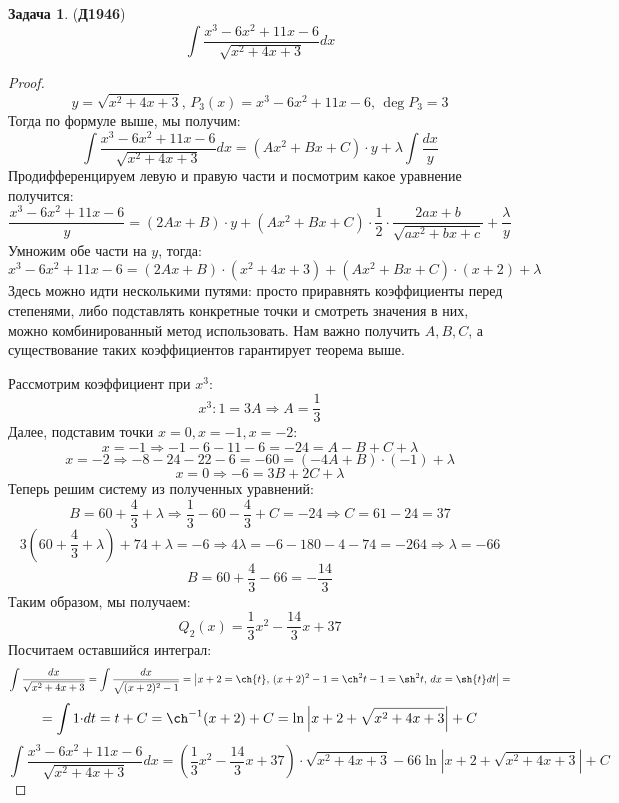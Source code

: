 \documentclass[12pt]{article}
\theoremstyle{definition}
\newtheorem{problem}{Задача}
\DeclareMathOperator{\dint}{\displaystyle\int}
\begin{document}
\begin{problem}(\textbf{Д1946})
	$$
		\dint \dfrac{x^3 - 6x^2 +11 x - 6}{\sqrt{x^2 + 4x + 3}}dx
	$$
\end{problem}
\begin{proof}
	$$
		y = \sqrt{x^2 + 4x + 3}, \, P_3(x) = x^3 - 6x^2 + 11x - 6, \, \deg{P_3} = 3
	$$
	Тогда по формуле выше, мы получим:
	$$
		\dint \dfrac{x^3 - 6x^2 +11 x - 6}{\sqrt{x^2 + 4x + 3}}dx = (Ax^2 + Bx + C){\cdot}y + \lambda \dint \dfrac{dx}{y}
	$$
	Продифференцируем левую и правую части и посмотрим какое уравнение получится:
	$$
		\dfrac{x^3 - 6x^2 +11 x - 6}{y} = (2Ax + B){\cdot}y + (Ax^2 + Bx + C){\cdot}\dfrac{1}{2}{\cdot}\dfrac{2ax + b}{\sqrt{ax^2 +bx + c}} + \dfrac{\lambda}{y}
	$$
	Умножим обе части на $y$, тогда:
	$$
		x^3 - 6x^2 + 11x -6 = (2Ax + B){\cdot}(x^2 + 4x + 3) + (Ax^2 + Bx + C){\cdot}(x + 2) + \lambda
	$$
	Здесь можно идти несколькими путями: просто приравнять коэффициенты перед степенями, либо подставлять конкретные точки и смотреть значения в них, можно комбинированный метод использовать. Нам важно получить $A,B,C$, а существование таких коэффициентов гарантирует теорема выше.
	
	Рассмотрим коэффициент при $x^3$:
	$$
		x^3 \colon 1 = 3A \Rightarrow A = \dfrac{1}{3}
	$$
	Далее, подставим точки $x = 0, x = -1, x = -2$:
	$$
		x = -1 \Rightarrow -1 - 6 - 11 - 6 = -24 = A - B + C + \lambda
	$$ 
	$$
		x = -2 \Rightarrow -8 -24 -22 -6 = -60 = (-4A + B){\cdot}(-1)+ \lambda
	$$
	$$
		x = 0 \Rightarrow -6 = 3B + 2C + \lambda
	$$
	Теперь решим систему из полученных уравнений:
	$$
		B = 60 + \dfrac{4}{3} + \lambda \Rightarrow \dfrac{1}{3} - 60 -\dfrac{4}{3} + C = -24 \Rightarrow C = 61 - 24 = 37
	$$
	$$
		3\left(60 + \dfrac{4}{3} + \lambda\right) + 74 + \lambda = -6 \Rightarrow 4\lambda = -6 -180 -4 -74 = -264 \Rightarrow \lambda = - 66
	$$
	$$
		B = 60 + \dfrac{4}{3} - 66 = -\dfrac{14}{3}
	$$
	Таким образом, мы получаем:
	$$
		Q_2(x) = \dfrac{1}{3}x^2 -\dfrac{14}{3}x + 37 
	$$
	Посчитаем оставшийся интеграл:
	$$
		\dint \dfrac{dx}{\sqrt{x^2 +4x + 3}} = \dint \dfrac{dx}{\sqrt{(x+2)^2 -1}} = \left|x + 2 = \ch{t}, \, (x+ 2)^2 - 1 =\ch^2{t} - 1 = \sh^2{t}, \, dx = \sh{t}dt\right| =
	$$
	$$
		=\dint  1 {\cdot}dt = t + C  = \ch^{-1}(x+ 2) + C = \ln{\left|x+2 + \sqrt{x^2 + 4x + 3}\right|} + C
	$$
	$$
		\dint \dfrac{x^3 - 6x^2 +11 x - 6}{\sqrt{x^2 + 4x + 3}}dx = \left(\dfrac{1}{3}x^2 -\dfrac{14}{3}x + 37 \right){\cdot}\sqrt{x^2 + 4x + 3} - 66\ln{\left|x+2 + \sqrt{x^2 + 4x + 3}\right|} + C
	$$
\end{proof}
\end{document}
